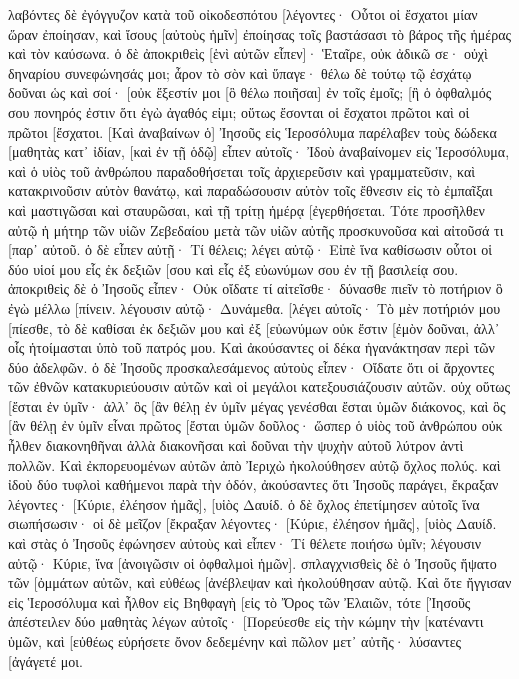 λαβόντες δὲ ἐγόγγυζον κατὰ τοῦ οἰκοδεσπότου 
[λέγοντες· Οὗτοι οἱ ἔσχατοι μίαν ὥραν ἐποίησαν, καὶ ἴσους [αὐτοὺς ἡμῖν] ἐποίησας τοῖς βαστάσασι τὸ βάρος τῆς ἡμέρας καὶ τὸν καύσωνα. 
ὁ δὲ ἀποκριθεὶς [ἑνὶ αὐτῶν εἶπεν]· Ἑταῖρε, οὐκ ἀδικῶ σε· οὐχὶ δηναρίου συνεφώνησάς μοι; 
ἆρον τὸ σὸν καὶ ὕπαγε· θέλω δὲ τούτῳ τῷ ἐσχάτῳ δοῦναι ὡς καὶ σοί· 
[οὐκ ἔξεστίν μοι [ὃ θέλω ποιῆσαι] ἐν τοῖς ἐμοῖς; [ἢ ὁ ὀφθαλμός σου πονηρός ἐστιν ὅτι ἐγὼ ἀγαθός εἰμι; 
οὕτως ἔσονται οἱ ἔσχατοι πρῶτοι καὶ οἱ πρῶτοι [ἔσχατοι. 
[Καὶ ἀναβαίνων ὁ] Ἰησοῦς εἰς Ἱεροσόλυμα παρέλαβεν τοὺς δώδεκα [μαθητὰς κατ᾽ ἰδίαν, [καὶ ἐν τῇ ὁδῷ] εἶπεν αὐτοῖς· 
Ἰδοὺ ἀναβαίνομεν εἰς Ἱεροσόλυμα, καὶ ὁ υἱὸς τοῦ ἀνθρώπου παραδοθήσεται τοῖς ἀρχιερεῦσιν καὶ γραμματεῦσιν, καὶ κατακρινοῦσιν αὐτὸν θανάτῳ, 
καὶ παραδώσουσιν αὐτὸν τοῖς ἔθνεσιν εἰς τὸ ἐμπαῖξαι καὶ μαστιγῶσαι καὶ σταυρῶσαι, καὶ τῇ τρίτῃ ἡμέρᾳ [ἐγερθήσεται. 
Τότε προσῆλθεν αὐτῷ ἡ μήτηρ τῶν υἱῶν Ζεβεδαίου μετὰ τῶν υἱῶν αὐτῆς προσκυνοῦσα καὶ αἰτοῦσά τι [παρ᾽ αὐτοῦ. 
ὁ δὲ εἶπεν αὐτῇ· Τί θέλεις; λέγει αὐτῷ· Εἰπὲ ἵνα καθίσωσιν οὗτοι οἱ δύο υἱοί μου εἷς ἐκ δεξιῶν [σου καὶ εἷς ἐξ εὐωνύμων σου ἐν τῇ βασιλείᾳ σου. 
ἀποκριθεὶς δὲ ὁ Ἰησοῦς εἶπεν· Οὐκ οἴδατε τί αἰτεῖσθε· δύνασθε πιεῖν τὸ ποτήριον ὃ ἐγὼ μέλλω [πίνειν. λέγουσιν αὐτῷ· Δυνάμεθα. 
[λέγει αὐτοῖς· Τὸ μὲν ποτήριόν μου [πίεσθε, τὸ δὲ καθίσαι ἐκ δεξιῶν μου καὶ ἐξ [εὐωνύμων οὐκ ἔστιν [ἐμὸν δοῦναι, ἀλλ᾽ οἷς ἡτοίμασται ὑπὸ τοῦ πατρός μου. 
Καὶ ἀκούσαντες οἱ δέκα ἠγανάκτησαν περὶ τῶν δύο ἀδελφῶν. 
ὁ δὲ Ἰησοῦς προσκαλεσάμενος αὐτοὺς εἶπεν· Οἴδατε ὅτι οἱ ἄρχοντες τῶν ἐθνῶν κατακυριεύουσιν αὐτῶν καὶ οἱ μεγάλοι κατεξουσιάζουσιν αὐτῶν. 
οὐχ οὕτως [ἔσται ἐν ὑμῖν· ἀλλ᾽ ὃς [ἂν θέλῃ ἐν ὑμῖν μέγας γενέσθαι ἔσται ὑμῶν διάκονος, 
καὶ ὃς [ἂν θέλῃ ἐν ὑμῖν εἶναι πρῶτος [ἔσται ὑμῶν δοῦλος· 
ὥσπερ ὁ υἱὸς τοῦ ἀνθρώπου οὐκ ἦλθεν διακονηθῆναι ἀλλὰ διακονῆσαι καὶ δοῦναι τὴν ψυχὴν αὐτοῦ λύτρον ἀντὶ πολλῶν. 
Καὶ ἐκπορευομένων αὐτῶν ἀπὸ Ἰεριχὼ ἠκολούθησεν αὐτῷ ὄχλος πολύς. 
καὶ ἰδοὺ δύο τυφλοὶ καθήμενοι παρὰ τὴν ὁδόν, ἀκούσαντες ὅτι Ἰησοῦς παράγει, ἔκραξαν λέγοντες· [Κύριε, ἐλέησον ἡμᾶς], [υἱὸς Δαυίδ. 
ὁ δὲ ὄχλος ἐπετίμησεν αὐτοῖς ἵνα σιωπήσωσιν· οἱ δὲ μεῖζον [ἔκραξαν λέγοντες· [Κύριε, ἐλέησον ἡμᾶς], [υἱὸς Δαυίδ. 
καὶ στὰς ὁ Ἰησοῦς ἐφώνησεν αὐτοὺς καὶ εἶπεν· Τί θέλετε ποιήσω ὑμῖν; 
λέγουσιν αὐτῷ· Κύριε, ἵνα [ἀνοιγῶσιν οἱ ὀφθαλμοὶ ἡμῶν]. 
σπλαγχνισθεὶς δὲ ὁ Ἰησοῦς ἥψατο τῶν [ὀμμάτων αὐτῶν, καὶ εὐθέως [ἀνέβλεψαν καὶ ἠκολούθησαν αὐτῷ. 
Καὶ ὅτε ἤγγισαν εἰς Ἱεροσόλυμα καὶ ἦλθον εἰς Βηθφαγὴ [εἰς τὸ Ὄρος τῶν Ἐλαιῶν, τότε [Ἰησοῦς ἀπέστειλεν δύο μαθητὰς 
λέγων αὐτοῖς· [Πορεύεσθε εἰς τὴν κώμην τὴν [κατέναντι ὑμῶν, καὶ [εὐθέως εὑρήσετε ὄνον δεδεμένην καὶ πῶλον μετ᾽ αὐτῆς· λύσαντες [ἀγάγετέ μοι. 
